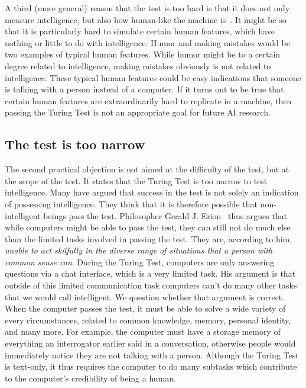 A third (more general) reason that the test is too hard is that it does not only measure intelligence, but also how human-like the machine is~\cite{sep-turing-test}. It might be so that it is particularly hard to simulate certain human features, which have nothing or little to do with intelligence. Humor and making mistakes would be two examples of typical human features. While humor might be to a certain degree related to intelligence, making mistakes obviously is not related to intelligence. These typical human features could be easy indications that someone is talking with a person instead of a computer. If it turns out to be true that certain human features are extraordinarily hard to replicate in a machine, then passing the Turing Test is not an appropriate goal for future AI research.


\subsection{The test is too narrow}
The second practical objection is not aimed at the difficulty of the test, but at the scope of the test. It states that the Turing Test is too narrow to test intelligence. Many have argued that success in the test is not solely an indication of possessing intelligence. They think that it is therefore possible that non-intelligent beings pass the test. Philosopher Gerald J. Erion~\cite{erion2001cartesian} thus argues that while computers might be able to pass the test, they can still not do much else than the limited tasks involved in passing the test. They are, according to him, \textit{unable to act skilfully in the diverse range of situations that a person with common sense can}. During the Turing Test, computers are only answering questions via a chat interface, which is a very limited task. His argument is that outside of this limited communication task computers can't do many other tasks that we would call intelligent. We question whether that argument is correct. When the computer passes the test, it must be able to solve a wide variety of every circumstances, related to common knowledge, memory, personal identity, and many more. For example, the computer must have a storage memory of everything an interrogator earlier said in a conversation, otherwise people would immediately notice they are not talking with a person. Although the Turing Test is text-only, it thus requires the computer to do many subtasks which contribute to the computer's credibility of being a human.
